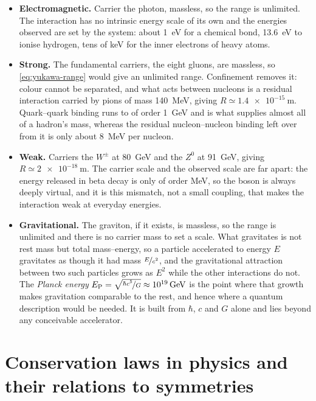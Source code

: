    \begin{itemize}
        \item \textbf{Electromagnetic.} Carrier the photon, massless, so the range is unlimited. The interaction has no intrinsic energy scale of its own and the energies observed are set by the system: about \qty{1}{\electronvolt} for a chemical bond, \qty{13.6}{\electronvolt} to ionise hydrogen, tens of \unit{\kilo\electronvolt} for the inner electrons of heavy atoms.
        \item \textbf{Strong.} The fundamental carriers, the eight gluons, are massless, so \cref{eq:yukawa-range} would give an unlimited range. Confinement removes it: colour cannot be separated, and what acts between nucleons is a residual interaction carried by pions of mass \qty{140}{\mega\electronvolt}, giving $R\simeq\qty{1.4e-15}{\metre}$. Quark--quark binding runs to of order \qty{1}{\giga\electronvolt} and is what supplies almost all of a hadron's mass, whereas the residual nucleon--nucleon binding left over from it is only about \qty{8}{\mega\electronvolt} per nucleon.
        \item \textbf{Weak.} Carriers the $W^{\pm}$ at \qty{80}{\giga\electronvolt} and the $Z^{0}$ at \qty{91}{\giga\electronvolt}, giving $R\simeq\qty{2e-18}{\metre}$. The carrier scale and the observed scale are far apart: the energy released in beta decay is only of order MeV, so the boson is always deeply virtual, and it is this mismatch, not a small coupling, that makes the interaction weak at everyday energies.
        \item \textbf{Gravitational.} The graviton, if it exists, is massless, so the range is unlimited and there is no carrier mass to set a scale. What gravitates is not rest mass but total mass--energy, so a particle accelerated to energy $E$ gravitates as though it had mass $\nicefrac{E}{c^{2}}$, and the gravitational attraction between two such particles grows as $E^{2}$ while the other interactions do not. The \emph{Planck energy} $E_{\mathrm{P}}=\sqrt{\nicefrac{\hbar c^{5}}{G}}\approx\qty{e19}{\giga\electronvolt}$ is the point where that growth makes gravitation comparable to the rest, and hence where a quantum description would be needed. It is built from $\hbar$, $c$ and $G$ alone and lies beyond any conceivable accelerator.
    \end{itemize}

    \FloatBarrier

\section{Conservation laws in physics and their relations to symmetries}
\label{sec:conservation}

